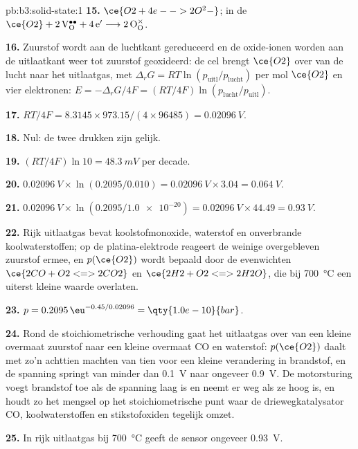 \begin{solution}{pb:b3:solid-state:1}
\textbf{15.} $\ce{O2 + 4e- -> 2O^2-}$; in de  $\ce{O2} + \mathrm{2\,V_O^{\bullet\bullet} + 4\,e'} \longrightarrow \mathrm{2\,O_O^{\times}}$.

\textbf{16.} Zuurstof wordt aan de luchtkant gereduceerd en de oxide-ionen
worden aan de uitlaatkant weer tot zuurstof geoxideerd: de cel brengt $\ce{O2}$ over van de lucht naar het uitlaatgas, met
$\Delta_rG = RT\ln(p_{\mathrm{uitl}}/p_{\mathrm{lucht}})$ per mol $\ce{O2}$ en vier elektronen: $E = -\Delta_rG/4F = (RT/4F)\ln(p_{\mathrm{lucht}}/p_{\mathrm{uitl}})$.

\textbf{17.} $RT/4F = 8.3145 \times 973.15/(4 \times 96485) = \qty{0.02096}{V}$.

\textbf{18.} Nul: de twee drukken zijn gelijk.

\textbf{19.} $(RT/4F)\ln 10 = \qty{48.3}{mV}$ per decade.

\textbf{20.} $\qty{0.02096}{V} \times \ln(0.2095/0.010) = \qty{0.02096}{V} \times 3.04 = \qty{0.064}{V}$.

\textbf{21.} $\qty{0.02096}{V} \times \ln(0.2095/\num{1.0e-20}) = \qty{0.02096}{V} \times 44.49 = \qty{0.93}{V}$.

\textbf{22.} Rijk uitlaatgas bevat koolstofmonoxide, waterstof en
onverbrande koolwaterstoffen; op de platina-elektrode reageert de weinige
overgebleven zuurstof ermee,
en $p(\ce{O2})$ wordt bepaald door de evenwichten $\ce{2CO + O2 <=> 2CO2}$ en $\ce{2H2 + O2 <=> 2H2O}$, die bij \qty{700}{\celsius} een
uiterst kleine waarde overlaten.

\textbf{23.} $p = 0.2095\,\eu^{-0.45/0.02096} = \qty{1.0e-10}{bar}$.

\textbf{24.} Rond de stoichiometrische verhouding gaat het uitlaatgas over
van een kleine overmaat zuurstof naar een kleine overmaat CO en
waterstof: $p(\ce{O2})$ daalt met zo'n achttien
machten van tien voor een kleine verandering in brandstof, en de spanning
springt van minder dan
\qty{0.1}{V} naar ongeveer \qty{0.9}{V}. De motorsturing voegt brandstof toe als de spanning laag is en
neemt er weg als ze hoog is, en houdt zo het mengsel op het
stoichiometrische punt waar de driewegkatalysator CO, koolwaterstoffen en
stikstofoxiden tegelijk omzet.

\textbf{25.} In rijk uitlaatgas bij \qty{700}{\celsius} geeft de sensor ongeveer \qty{0.93}{V}.
\end{solution}
